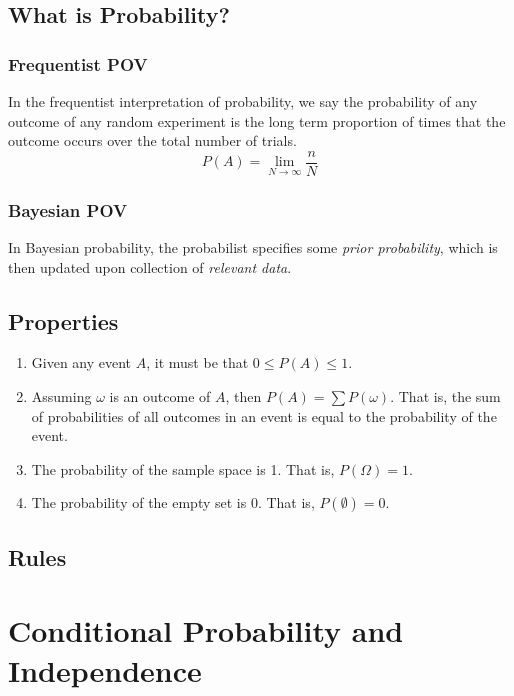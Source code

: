 \subsection{What is Probability?}  %
\subsubsection{Frequentist POV}  %
In the frequentist interpretation of probability, we say the probability of any outcome of any random experiment is the long term proportion of times that the outcome occurs over the total number of trials.
\begin{equation}
    P(A)=\lim_{N\to\infty}\frac{n}{N}
\end{equation}

\subsubsection{Bayesian POV}  %
In Bayesian probability, the probabilist specifies some \emph{prior probability}, which is then updated upon collection of \emph{relevant data}.

\subsection{Properties}  %
\begin{enumerate}
    \item Given any event $A$, it must be that $0\leq P(A) \leq 1$.
    \item Assuming $\omega$ is an outcome of $A$, then $P(A)=\sum P(\omega)$. That is, the sum of probabilities of all outcomes in an event is equal to the probability of the event.
    \item The probability of the sample space is 1. That is, $P(\Omega)=1$.
    \item The probability of the empty set is 0. That is, $P(\emptyset)=0$.
\end{enumerate}

\subsection{Rules}  %

\section{Conditional Probability and Independence}  %
